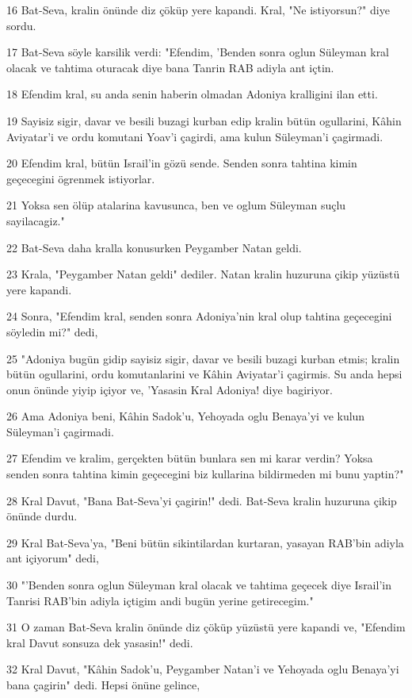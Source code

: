 \par 16 Bat-Seva, kralin önünde diz çöküp yere kapandi. Kral, "Ne istiyorsun?" diye sordu.
\par 17 Bat-Seva söyle karsilik verdi: "Efendim, 'Benden sonra oglun Süleyman kral olacak ve tahtima oturacak diye bana Tanrin RAB adiyla ant içtin.
\par 18 Efendim kral, su anda senin haberin olmadan Adoniya kralligini ilan etti.
\par 19 Sayisiz sigir, davar ve besili buzagi kurban edip kralin bütün ogullarini, Kâhin Aviyatar'i ve ordu komutani Yoav'i çagirdi, ama kulun Süleyman'i çagirmadi.
\par 20 Efendim kral, bütün Israil'in gözü sende. Senden sonra tahtina kimin geçecegini ögrenmek istiyorlar.
\par 21 Yoksa sen ölüp atalarina kavusunca, ben ve oglum Süleyman suçlu sayilacagiz."
\par 22 Bat-Seva daha kralla konusurken Peygamber Natan geldi.
\par 23 Krala, "Peygamber Natan geldi" dediler. Natan kralin huzuruna çikip yüzüstü yere kapandi.
\par 24 Sonra, "Efendim kral, senden sonra Adoniya'nin kral olup tahtina geçecegini söyledin mi?" dedi,
\par 25 "Adoniya bugün gidip sayisiz sigir, davar ve besili buzagi kurban etmis; kralin bütün ogullarini, ordu komutanlarini ve Kâhin Aviyatar'i çagirmis. Su anda hepsi onun önünde yiyip içiyor ve, 'Yasasin Kral Adoniya! diye bagiriyor.
\par 26 Ama Adoniya beni, Kâhin Sadok'u, Yehoyada oglu Benaya'yi ve kulun Süleyman'i çagirmadi.
\par 27 Efendim ve kralim, gerçekten bütün bunlara sen mi karar verdin? Yoksa senden sonra tahtina kimin geçecegini biz kullarina bildirmeden mi bunu yaptin?"
\par 28 Kral Davut, "Bana Bat-Seva'yi çagirin!" dedi. Bat-Seva kralin huzuruna çikip önünde durdu.
\par 29 Kral Bat-Seva'ya, "Beni bütün sikintilardan kurtaran, yasayan RAB'bin adiyla ant içiyorum" dedi,
\par 30 "'Benden sonra oglun Süleyman kral olacak ve tahtima geçecek diye Israil'in Tanrisi RAB'bin adiyla içtigim andi bugün yerine getirecegim."
\par 31 O zaman Bat-Seva kralin önünde diz çöküp yüzüstü yere kapandi ve, "Efendim kral Davut sonsuza dek yasasin!" dedi.
\par 32 Kral Davut, "Kâhin Sadok'u, Peygamber Natan'i ve Yehoyada oglu Benaya'yi bana çagirin" dedi. Hepsi önüne gelince,
